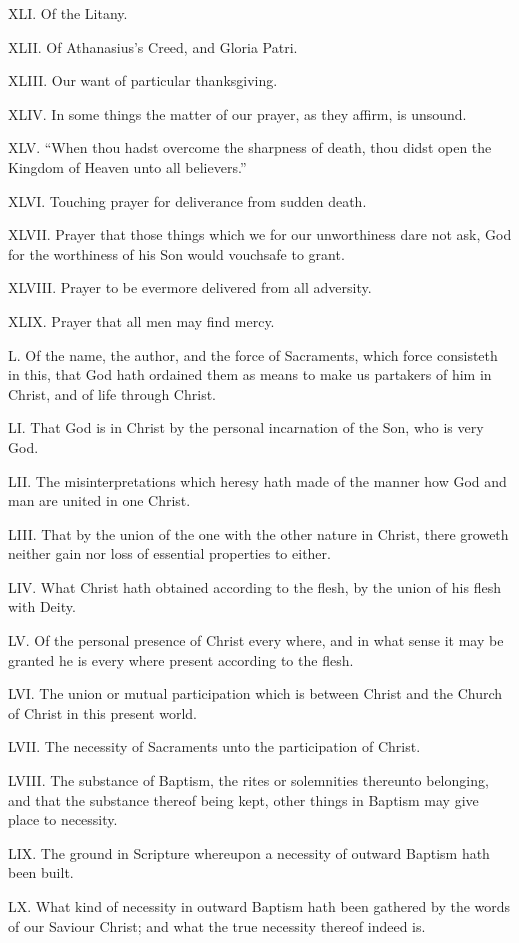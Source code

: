XLI. Of the Litany.

XLII. Of Athanasius’s Creed, and Gloria Patri.

XLIII. Our want of particular thanksgiving.

XLIV. In some things the matter of our prayer, as they affirm, is unsound.

XLV. “When thou hadst overcome the sharpness of death, thou didst open the Kingdom of Heaven unto all believers.”

XLVI. Touching prayer for deliverance from sudden death.

XLVII. Prayer that those things which we for our unworthiness dare not ask, God for the worthiness of his Son would vouchsafe to grant.

XLVIII. Prayer to be evermore delivered from all adversity.

XLIX. Prayer that all men may find mercy.

L. Of the name, the author, and the force of Sacraments, which force consisteth in this, that God hath ordained them as means to make us partakers of him in Christ, and of life through Christ.

LI. That God is in Christ by the personal incarnation of the Son, who is very God.  

LII. The misinterpretations which heresy hath made of the manner how God and man are united in one Christ.

LIII. That by the union of the one with the other nature in Christ, there groweth neither gain nor loss of essential properties to either.

LIV. What Christ hath obtained according to the flesh, by the union of his flesh with Deity.

LV. Of the personal presence of Christ every where, and in what sense it may be granted he is every where present according to the flesh.

LVI. The union or mutual participation which is between Christ and the Church of Christ in this present world.

LVII. The necessity of Sacraments unto the participation of Christ.

LVIII. The substance of Baptism, the rites or solemnities thereunto belonging, and that the substance thereof being kept, other things in Baptism may give place to necessity.

LIX. The ground in Scripture whereupon a necessity of outward Baptism hath been built.

LX. What kind of necessity in outward Baptism hath been gathered by the words of our Saviour Christ; and what the true necessity thereof indeed is.

